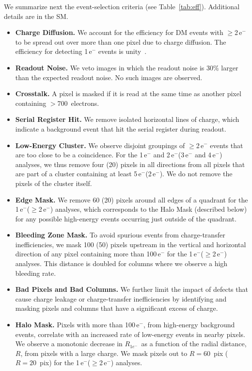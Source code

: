 \documentclass[aps,prl,twocolumn,showpacs,superscriptaddress,preprintnumbers]{revtex4-1}
\newcommand{\unit}[1]{\ensuremath{\mathrm{\,#1}}\xspace}
\newcommand{\e}{\unit{e^{-}}}
\newcommand{\Rs}{$R_{1e^-}$}
\begin{document}
We summarize next the event-selection criteria (see Table~\ref{tab:eff}). Additional details are in the SM.  
\begin{itemize}[leftmargin=*]\addtolength{\itemsep}{-0.7\baselineskip}
%
\item {\bf Charge Diffusion.} We account for the efficiency for DM events with $\ge$2\e to be spread out over more than one pixel due to charge diffusion.  The efficiency for detecting 1\e events is unity~\cite{LBNLQE}. 
%
\item {\bf Readout Noise.}  We veto images in which the readout noise is 30\% larger than the expected readout noise.  No such images are observed. 
%
\item {\bf Crosstalk.} 
A pixel is masked if it is read at the same time as another pixel containing $>$700~electrons. 
%
\item {\bf Serial Register Hit.} We remove isolated horizontal lines of charge, which indicate a background event that hit the serial register during readout. 
%
\item {\bf Low-Energy Cluster.} 
We observe disjoint groupings of $\ge$2\e events that are too close to be a coincidence.
For the 1\e and 2\e (3\e and 4\e) analyses, we thus remove four (20) pixels in all directions from all pixels that are part of a cluster containing at least 5\e (2\e). We do not remove the pixels of the cluster itself.
%
\item {\bf Edge Mask.}  We remove 60 (20) pixels around all edges of a quadrant for the 1\e ($\ge$2\e) analyses, which corresponds to the Halo Mask (described below) for any possible high-energy events occurring just outside of the quadrant. %
\item {\bf Bleeding Zone Mask.}
To avoid spurious events from charge-transfer inefficiencies, we mask 100 (50) pixels upstream in the vertical and horizontal direction of any pixel containing more than 100\e for the 1\e ($\ge$2\e) analyses. This distance is doubled for columns where we observe a high bleeding rate.
%
\item {\bf Bad Pixels and Bad Columns.} 
We further limit the impact of defects that cause charge leakage or charge-transfer inefficiencies by identifying and masking pixels and columns that have a significant excess of charge.
%
\item {\bf Halo Mask.}  Pixels with more than 100\e, from high-energy background events, correlate with an increased rate of low-energy events in nearby pixels.  We observe a monotonic decrease in \Rs\ as a function of the radial distance, $R$, from pixels with a large charge.  We mask pixels out to $R=60$~pix ($R=20$~pix) for the 1\e ($\ge$2\e) analyses. 

\end{itemize}
\end{document}
